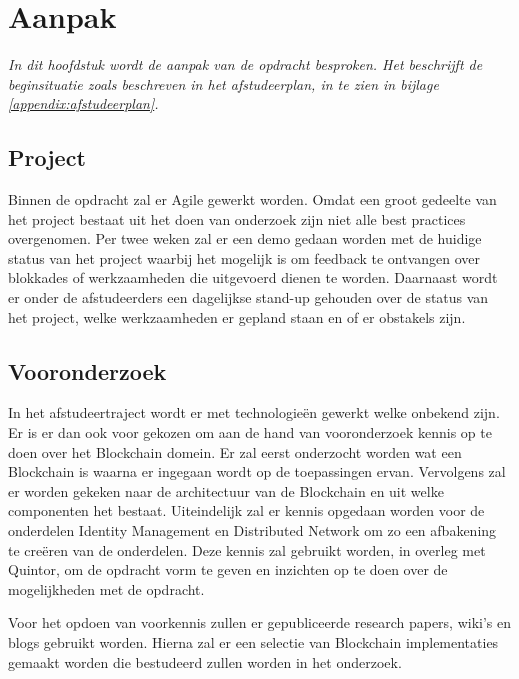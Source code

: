 \chapter{Aanpak}
\label{Aanpak}

\textit{In dit hoofdstuk wordt de aanpak van de opdracht besproken. Het beschrijft de beginsituatie zoals beschreven in het afstudeerplan, in te zien in bijlage \ref{appendix:afstudeerplan}.}

\section{Project}

Binnen de opdracht zal er Agile gewerkt worden. Omdat een groot gedeelte van het project bestaat uit het doen van onderzoek zijn niet alle best practices overgenomen. Per twee weken zal er een demo gedaan worden met de huidige status van het project waarbij het mogelijk is om feedback te ontvangen over blokkades of werkzaamheden die uitgevoerd dienen te worden. Daarnaast wordt er onder de afstudeerders een dagelijkse stand-up gehouden over de status van het project, welke werkzaamheden er gepland staan en of er obstakels zijn.

\section{Vooronderzoek} In het afstudeertraject wordt er met technologieën gewerkt welke onbekend zijn. Er is er dan ook voor gekozen om aan de hand van vooronderzoek kennis op te doen over het Blockchain domein. Er zal eerst onderzocht worden wat een Blockchain is waarna er ingegaan wordt op de toepassingen ervan. Vervolgens zal er worden gekeken naar de architectuur van de Blockchain en uit welke componenten het bestaat. Uiteindelijk zal er kennis opgedaan worden voor de onderdelen Identity Management en Distributed Network om zo een afbakening te creëren van de onderdelen. Deze kennis zal gebruikt worden, in overleg met Quintor, om de opdracht vorm te geven en inzichten op te doen over de mogelijkheden met de opdracht. 

Voor het opdoen van voorkennis zullen er gepubliceerde research papers, wiki’s en blogs gebruikt worden. Hierna zal er een selectie van Blockchain implementaties gemaakt worden die bestudeerd zullen worden in het onderzoek.

\newpage
